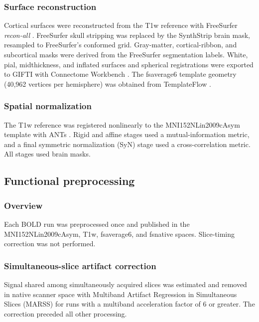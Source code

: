 \subsubsection*{Surface reconstruction}

Cortical surfaces were reconstructed from the T1w reference with FreeSurfer \emph{recon-all} \citep{dale1999cortical,fischl2012freesurfer}. FreeSurfer skull stripping was replaced by the SynthStrip brain mask, resampled to FreeSurfer's conformed grid. Gray-matter, cortical-ribbon, and subcortical masks were derived from the FreeSurfer segmentation labels. White, pial, midthickness, and inflated surfaces and spherical registrations were exported to GIFTI with Connectome Workbench \citep{marcus2011workbench}. The fsaverage6 template geometry (40,962 vertices per hemisphere) was obtained from TemplateFlow \citep{ciric2022templateflow}.

\subsubsection*{Spatial normalization}

The T1w reference was registered nonlinearly to the MNI152NLin2009cAsym template \citep{fonov2011mni} with ANTs \citep{avants2011ants}. Rigid and affine stages used a mutual-information metric, and a final symmetric normalization (SyN) stage \citep{avants2008syn} used a cross-correlation metric. All stages used brain masks.

\subsection*{Functional preprocessing}

\subsubsection*{Overview}

Each BOLD run was preprocessed once and published in the MNI152NLin2009cAsym, T1w, fsaverage6, and fsnative spaces. Slice-timing correction was not performed.

\subsubsection*{Simultaneous-slice artifact correction}

Signal shared among simultaneously acquired slices was estimated and removed in native scanner space with Multiband Artifact Regression in Simultaneous Slices (MARSS) \citep{tubiolo2024marss} for runs with a multiband acceleration factor of 6 or greater. The correction preceded all other processing.

